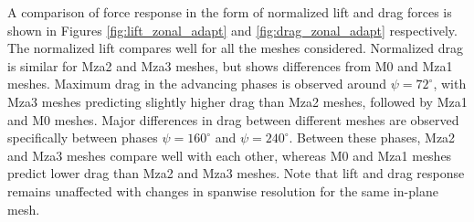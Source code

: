 
A comparison of force response in the form of normalized lift and drag forces is shown in Figures \ref{fig:lift_zonal_adapt} and \ref{fig:drag_zonal_adapt} respectively. The normalized lift compares well for all the meshes considered. Normalized drag is similar for Mza2 and Mza3 meshes, but shows differences from M0 and Mza1 meshes. Maximum drag in the advancing phases is observed around $\psi=72^\circ$, with Mza3 meshes predicting slightly higher drag than Mza2 meshes, followed by Mza1 and M0 meshes. Major differences in drag between different meshes are observed specifically between phases $\psi=160^\circ$ and $\psi=240^\circ$. Between these phases, Mza2 and Mza3 meshes compare well with each other, whereas M0 and Mza1 meshes predict lower drag than Mza2 and Mza3 meshes. Note that lift and drag response remains unaffected with changes in spanwise resolution for the same in-plane mesh.

